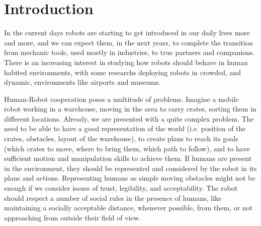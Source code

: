 
\chapter{Introduction} %

\label{chapter-introduction} %



In the current days robots are starting to get introduced in our daily lives more and more, and we can expect them, in the next years, to complete the transition from mechanic tools, used mostly in industries, to true partners and companions. There is an increasing interest in studying how robots should behave in human habited environments, with some researchs deploying robots in crowded, and dynamic, environments like airports and museums.

Human-Robot cooperation poses a multitude of problems. Imagine a mobile robot working in a warehouse, moving in the area to carry crates, sorting them in different locations. Already, we are presented with a quite complex problem. The need to be able to have a good representation of the world (i.e. position of the crates, obstacles, layout of the warehouse), to create plans to reach its goals (which crates to move, where to bring them, which path to follow), and to have sufficient motion and manipulation skills to achieve them. If humans are present in the environment, they should be represented and considered by the robot in its plans and actions. Representing humans as simple moving obstacles might not be enough if we consider issues of trust, legibility, and acceptability. The robot should respect a number of social rules in the presence of humans, like maintaining a socially acceptable distance, whenever possible, from them, or not approaching from outside their field of view.


